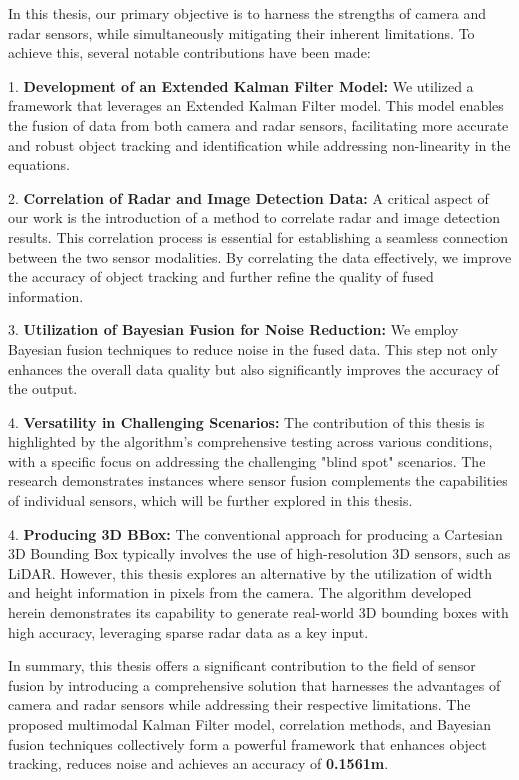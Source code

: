 In this thesis, our primary objective is to harness the strengths of camera and radar sensors, 
while simultaneously mitigating their inherent limitations. To achieve this, several notable contributions have been made:

1. \textbf{Development of an Extended Kalman Filter Model: }
We utilized a framework that leverages an Extended Kalman Filter model. 
This model enables the fusion of data from both camera and radar sensors, 
facilitating more accurate and robust object tracking and identification
 while addressing non-linearity in the equations.

2. \textbf{Correlation of Radar and Image Detection Data: }
A critical aspect of our work is the introduction of a method to correlate radar and image detection results. 
This correlation process is essential for establishing a seamless connection between the two sensor modalities.
By correlating the data effectively, we improve the accuracy of object tracking and further refine the quality of fused information.

3. \textbf{Utilization of Bayesian Fusion for Noise Reduction: }
We employ Bayesian fusion techniques to reduce noise in the fused data.
This step not only enhances the overall data quality but also significantly improves the accuracy of the output. 

4. \textbf{Versatility in Challenging Scenarios: }
The contribution of this thesis is highlighted by the algorithm's comprehensive testing across various conditions, 
with a specific focus on addressing the challenging "blind spot" scenarios. 
The research demonstrates instances where sensor fusion complements the capabilities of individual sensors, 
which will be further explored in this thesis.

4. \textbf{Producing 3D BBox: }
The conventional approach for producing a Cartesian 3D Bounding Box typically involves the use of high-resolution 3D sensors, 
such as LiDAR. 
However, this thesis explores an alternative by the utilization of width and height information in pixels from the camera. 
The algorithm developed herein demonstrates its capability to generate real-world 3D bounding boxes with high accuracy, 
leveraging sparse radar data as a key input.

In summary, this thesis offers a significant contribution to the field of sensor fusion by introducing a comprehensive solution 
that harnesses the advantages of camera and radar sensors while addressing their respective limitations.
The proposed multimodal Kalman Filter model, correlation methods, and Bayesian fusion techniques collectively form 
a powerful framework that enhances object tracking, reduces noise and achieves an accuracy of \textbf{0.1561m}.


